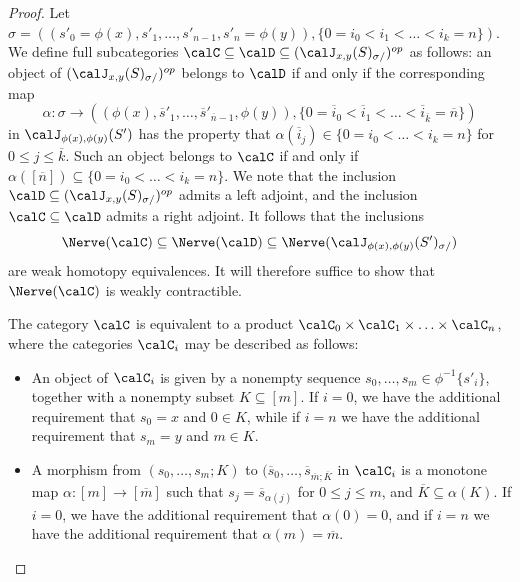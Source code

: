 \begin{proof}
Let $\sigma = ( (s'_0=\phi(x), s'_1, \ldots, s'_{n-1}, s'_n=\phi(y)), \{ 0 = i_0 < i_1 < \ldots < i_k = n \})$.
We define full subcategories $\calC \subseteq \calD \subseteq (\calJ_{x,y}(S)_{\sigma/})^{op}$ as follows: an object of $(\calJ_{x,y}(S)_{\sigma/})^{op}$ belongs to $\calD$ if and only if
the corresponding map
$$\alpha: \sigma \rightarrow ( (\phi(x), \overline{s}'_1, \ldots, \overline{s}'_{\overline{n}-1}, \phi(y)), \{ 0 = \overline{i}_0 < \overline{i}_1 < \ldots < \overline{i}_{ \overline{k}} = \overline{n} \})$$
in $\calJ_{\phi(x), \phi(y)}(S')$ has the property that 
$\alpha( \overline{i}_{j} ) \in \{ 0 = i_0 < \ldots < i_k = n \}$ for $0 \leq j \leq \overline{k}$. Such
an object belongs to $\calC$ if and only if $\alpha( [ \overline{n}] ) \subseteq \{ 0 = i_0 < \ldots < i_k = n \}$. We note that the inclusion $\calD \subseteq (\calJ_{x,y}(S)_{\sigma/})^{op}$ admits a left
adjoint, and the inclusion $\calC \subseteq \calD$ admits a right adjoint. It follows that the inclusions
$$\Nerve(\calC) \subseteq \Nerve(\calD) \subseteq \Nerve( \calJ_{ \phi(x), \phi(y)}(S')_{ \sigma/ })$$
are weak homotopy equivalences. It will therefore suffice to show that $\Nerve(\calC)$ is weakly contractible.

The category $\calC$ is equivalent to a product $\calC_0 \times \calC_1 \times \ldots \times \calC_n$, where the categories $\calC_i$ may be described as follows:
\begin{itemize}
\item An object of $\calC_i$ is given by a nonempty sequence
$s_0, \ldots, s_m \in \phi^{-1} \{ s'_i \}$, together with a nonempty subset $K \subseteq [m]$. 
If $i=0$, we have the additional requirement that $s_0 = x$ and $0 \in K$, while if $i =n$
we have the additional requirement that $s_m = y$ and $m \in K$.

\item A morphism from $(s_0, \ldots, s_m; K)$ to $( \overline{s}_0, \ldots, \overline{s}_{ \overline{m}; \overline{K} }$
in $\calC_i$ is a monotone map $\alpha: [m] \rightarrow [ \overline{m} ]$ such that
$s_{j} = \overline{s}_{ \alpha(j) }$ for $0 \leq j \leq m$, and $\overline{K} \subseteq \alpha(K)$.
If $i=0$, we have the additional requirement that $\alpha(0) = 0$, and if $i=n$ we have the additional requirement that $\alpha( m) = \overline{m}$.
\end{itemize}


\end{proof}
